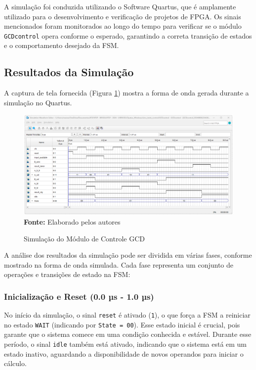 \documentclass[a4paper,11pt]{article} %
\begin{document}
A simulação foi conduzida utilizando o Software Quartus, que é amplamente utilizado para o desenvolvimento e verificação de projetos de FPGA. Os sinais mencionados foram monitorados ao longo do tempo para verificar se o módulo \texttt{GCDcontrol} opera conforme o esperado, garantindo a correta transição de estados e o comportamento desejado da FSM.
\subsection{Resultados da Simulação}

A captura de tela fornecida (Figura \ref{simulacao_gcd}) mostra a forma de onda gerada durante a simulação no Quartus.

\begin{figure}[ht]
    \centering
    \caption{Simulação do Módulo de Controle GCD}
    \includegraphics[width=15cm,angle=0]{imgs/simulacao_gcd_quartus.png}
    \\\textbf{Fonte:} Elaborado pelos autores
    \label{simulacao_gcd}
\end{figure}

A análise dos resultados da simulação pode ser dividida em várias fases, conforme mostrado na forma de onda simulada. Cada fase representa um conjunto de operações e transições de estado na FSM:

\subsubsection{Inicialização e Reset (0.0 µs - 1.0 µs)}

No início da simulação, o sinal \texttt{reset} é ativado (\texttt{1}), o que força a FSM a reiniciar no estado \texttt{WAIT} (indicando por \texttt{State = 00}). Esse estado inicial é crucial, pois garante que o sistema comece em uma condição conhecida e estável. Durante esse período, o sinal \texttt{idle} também está ativado, indicando que o sistema está em um estado inativo, aguardando a disponibilidade de novos operandos para iniciar o cálculo.
\end{document}
